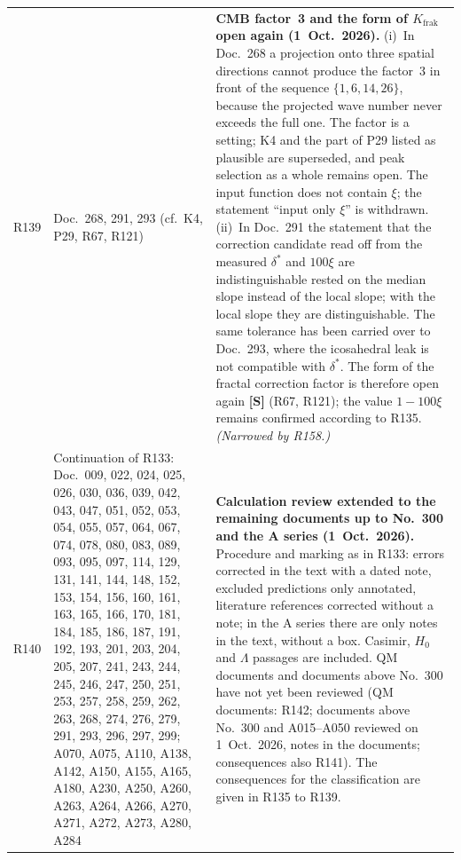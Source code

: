 \begin{longtable}{@{}p{0.9cm}p{3.1cm}p{10.2cm}@{}}
R139 & Doc.~268, 291, 293 (cf.\ K4, P29, R67, R121) & \textbf{CMB factor~3 and the form of $K_{\mathrm{frak}}$ open again (1~Oct.~2026).} (i)~In Doc.~268 a projection onto three spatial directions cannot produce the factor~3 in front of the sequence $\{1,6,14,26\}$, because the projected wave number never exceeds the full one. The factor is a setting; K4 and the part of P29 listed as plausible are superseded, and peak selection as a whole remains open. The input function does not contain $\xi$; the statement ``input only $\xi$'' is withdrawn. (ii)~In Doc.~291 the statement that the correction candidate read off from the measured $\delta^*$ and $100\xi$ are indistinguishable rested on the median slope instead of the local slope; with the local slope they are distinguishable. The same tolerance has been carried over to Doc.~293, where the icosahedral leak is not compatible with $\delta^*$. The form of the fractal correction factor is therefore open again \textbf{[S]} (R67, R121); the value $1-100\xi$ remains confirmed according to R135. \emph{(Narrowed by R158.)} \\
R140 & Continuation of R133: Doc.~009, 022, 024, 025, 026, 030, 036, 039, 042, 043, 047, 051, 052, 053, 054, 055, 057, 064, 067, 074, 078, 080, 083, 089, 093, 095, 097, 114, 129, 131, 141, 144, 148, 152, 153, 154, 156, 160, 161, 163, 165, 166, 170, 181, 184, 185, 186, 187, 191, 192, 193, 201, 203, 204, 205, 207, 241, 243, 244, 245, 246, 247, 250, 251, 253, 257, 258, 259, 262, 263, 268, 274, 276, 279, 291, 293, 296, 297, 299; A070, A075, A110, A138, A142, A150, A155, A165, A180, A230, A250, A260, A263, A264, A266, A270, A271, A272, A273, A280, A284 & \textbf{Calculation review extended to the remaining documents up to No.~300 and the A series (1~Oct.~2026).} Procedure and marking as in R133: errors corrected in the text with a dated note, excluded predictions only annotated, literature references corrected without a note; in the A series there are only notes in the text, without a box. Casimir, $H_0$ and $\Lambda$ passages are included. QM documents and documents above No.~300 have not yet been reviewed (QM documents: R142; documents above No.~300 and A015--A050 reviewed on 1~Oct.~2026, notes in the documents; consequences also R141). The consequences for the classification are given in R135 to R139. \\

\end{longtable}
